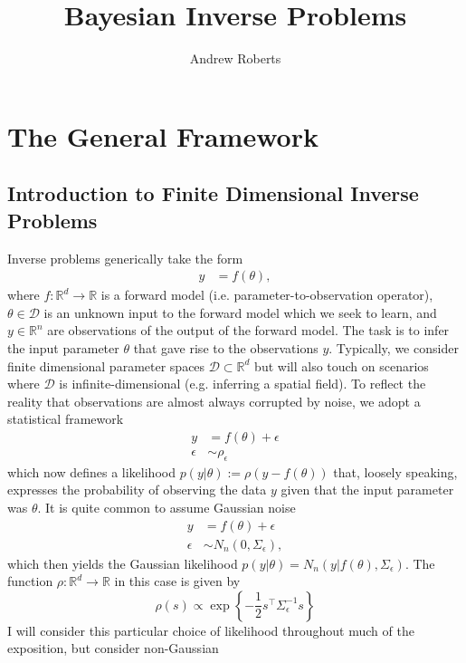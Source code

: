 \documentclass[12pt]{article}
\title{Bayesian Inverse Problems}
\author{Andrew Roberts}
\newcommand{\R}{\mathbb{R}}
\begin{document}
\maketitle
\tableofcontents
\newpage

\section{The General Framework}

\subsection{Introduction to Finite Dimensional Inverse Problems}
Inverse problems generically take the form
\begin{align}
y &= f(\theta),
\end{align}
where $f: \R^d \to \R$ is a forward model (i.e. parameter-to-observation operator), $\theta \in \mathcal{D}$ is an unknown input to the forward model which we seek to learn, and
$y \in \R^n$ are observations of the output of the forward model. The task is to infer the input parameter $\theta$ that gave rise to the observations $y$. Typically, we consider finite
dimensional parameter spaces $\mathcal{D} \subset \R^d$ but will also touch on scenarios where $\mathcal{D}$ is infinite-dimensional (e.g. inferring a spatial field). 
To reflect the reality that 
observations are almost always corrupted by noise, we adopt a statistical framework
\begin{align}
y &= f(\theta) + \epsilon \label{inverse_problem_statistical} \\
\epsilon &\sim \rho_\epsilon \nonumber
\end{align}
which now defines a likelihood $p(y|\theta) := \rho(y - f(\theta))$ that, loosely speaking, expresses the probability of observing the data $y$ given that the input parameter was $\theta$. It is quite common
to assume Gaussian noise 
\begin{align}
y &= f(\theta) + \epsilon \label{inverse_problem_statistical_Gaussian} \\
\epsilon &\sim N_n(0, \Sigma_\epsilon) \nonumber,
\end{align}
which then yields the Gaussian likelihood $p(y|\theta) = N_n(y|f(\theta), \Sigma_\epsilon)$. The function $\rho: \R^d \to \R$ in this case is given by 
\[\rho(s) \propto \exp\left\{-\frac{1}{2} s^{\top} \Sigma_{\epsilon}^{-1} s \right\}\]
 I will consider this particular choice of likelihood throughout much of the exposition, but consider non-Gaussian 
\end{document}
